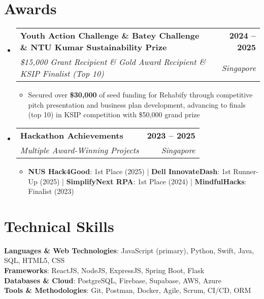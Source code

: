 \documentclass[letterpaper,11pt]{article}
\makeatletter
\newcommand{\resumeItem}[1]{
  \item\small{#1}
}
\newcommand{\resumeSubheading}[4]{
  \vspace{-2pt}\item
    \begin{tabular*}{1.0\textwidth}[t]{l@{\extracolsep{\fill}}r}
      \textbf{#1} & \textbf{\small #2} \\
      \textit{\small#3} & \textit{\small #4} \\
    \end{tabular*}\vspace{-7pt}
}
\newcommand{\resumeSubHeadingListStart}{\begin{itemize}[leftmargin=0.0in, label={}]}
\newcommand{\resumeSubHeadingListEnd}{\end{itemize}}
\newcommand{\resumeItemListStart}{\begin{itemize}}
\newcommand{\resumeItemListEnd}{\end{itemize}\vspace{-5pt}}
\makeatother
\begin{document}
\section{Awards}
    \resumeSubHeadingListStart
        \resumeSubheading
            {Youth Action Challenge \& Batey Challenge \& NTU Kumar Sustainability Prize}{2024 -- 2025}
            {\$15,000 Grant Recipient \& Gold Award Recipient \& KSIP Finalist (Top 10)}{Singapore}
            \resumeItemListStart
                \resumeItem{Secured over \textbf{\$30,000} of seed funding for Rehabify through competitive pitch presentation and business plan development, advancing to finals (top 10) in KSIP competition with \$50,000 grand prize}
            \resumeItemListEnd
            
        \resumeSubheading
            {Hackathon Achievements}{2023 -- 2025}
            {Multiple Award-Winning Projects}{Singapore}
            \resumeItemListStart
                \resumeItem{\textbf{NUS Hack4Good}: 1st Place (2025) |
                \textbf{Dell InnovateDash}: 1st Runner-Up (2025) |
                \textbf{SimplifyNext RPA}: 1st Place (2024) | \textbf{MindfulHacks}: Finalist (2023)}
            \resumeItemListEnd
    \resumeSubHeadingListEnd
\vspace{-16pt}

\section{Technical Skills}
 \begin{itemize}[leftmargin=0.15in, label={}]
    \small{\item{   
     \textbf{Languages \& Web Technologies}{: JavaScript (primary), Python, Swift, Java, SQL, HTML5, CSS} \\[1mm]
     \textbf{Frameworks}{: ReactJS, NodeJS, ExpressJS, Spring Boot, Flask} \\[1mm]
     \textbf{Databases \& Cloud}{: PostgreSQL, Firebase, Supabase, AWS, Azure} \\[1mm]
     \textbf{Tools \& Methodologies}{: Git, Postman, Docker, Agile, Scrum, CI/CD, ORM} \\
    }}
 \end{itemize}

\end{document}
